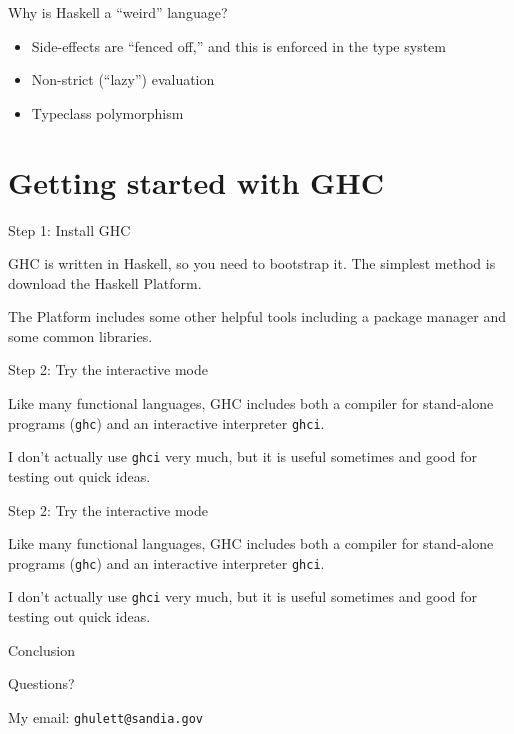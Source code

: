 \documentclass{beamer}
\begin{document}
%
\begin{frame}{Why is Haskell a ``weird'' language?}

\begin{itemize}
  \item Side-effects are ``fenced off,'' and this is enforced in the type system
  \item Non-strict (``lazy'') evaluation
  \item Typeclass polymorphism
\end{itemize}

\end{frame}

\section{Getting started with GHC}

%
\begin{frame}{Step 1: Install GHC}

GHC is written in Haskell, so you need to bootstrap it. The simplest method is
download the Haskell Platform.

The Platform includes some other helpful tools including a package manager and
some common libraries.

\end{frame}

%
\begin{frame}{Step 2: Try the interactive mode}

Like many functional languages, GHC includes both a compiler for stand-alone
programs (\texttt{ghc}) and an interactive interpreter \texttt{ghci}.

I don't actually use \texttt{ghci} very much, but it is useful sometimes and
good for testing out quick ideas.

\end{frame}

%
\begin{frame}{Step 2: Try the interactive mode}

Like many functional languages, GHC includes both a compiler for stand-alone
programs (\texttt{ghc}) and an interactive interpreter \texttt{ghci}.

I don't actually use \texttt{ghci} very much, but it is useful sometimes and
good for testing out quick ideas.

\end{frame}


%
\begin{frame}{Conclusion}

Questions?

My email: \texttt{ghulett@sandia.gov}

\end{frame}
\end{document}
